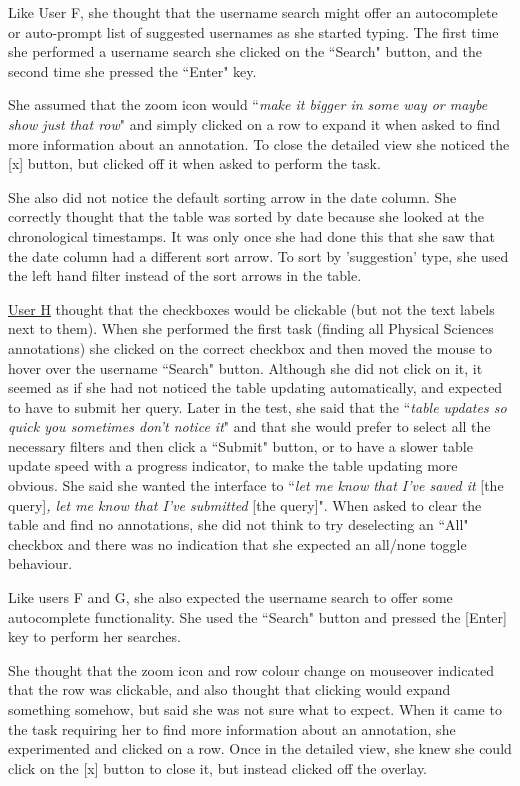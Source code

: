 Like User F, she thought that the username search might offer an autocomplete or auto-prompt list of suggested usernames as she started typing. The first time she performed a username search she clicked on the ``Search" button, and the second time she pressed the ``Enter" key. 

She assumed that the zoom icon would ``\textit{make it bigger in some way or maybe show just that row}" and simply clicked on a row to expand it when asked to find more information about an annotation. To close the detailed view she noticed the [x] button, but clicked off it when asked to perform the task. 

She also did not notice the default sorting arrow in the date column. She correctly thought that the table was sorted by date because she looked at the chronological timestamps. It was only once she had done this that she saw that the date column had a different sort arrow. To sort by 'suggestion' type, she used the left hand filter instead of the sort arrows in the table. 

\underline{User H} thought that the checkboxes would be clickable (but not the text labels next to them). When she performed the first task (finding all Physical Sciences annotations) she clicked on the correct checkbox and then moved the mouse to hover over the username ``Search" button. Although she did not click on it, it seemed as if she had not noticed the table updating automatically, and expected to have to submit her query. Later in the test, she said that the ``\textit{table updates so quick you sometimes don't notice it}" and that she would prefer to select all the necessary filters and then click a ``Submit" button, or to have a slower table update speed with a progress indicator, to make the table updating more obvious. She said she wanted the interface to ``\textit{let me know that I've saved it} [the query]\textit{, let me know that I've submitted} [the query]". When asked to clear the table and find no annotations, she did not think to try deselecting an ``All" checkbox and there was no indication that she expected an all/none toggle behaviour.

Like users F and G, she also expected the username search to offer some autocomplete functionality. She used the ``Search" button and pressed the [Enter] key to perform her searches. 

She thought that the zoom icon and row colour change on mouseover indicated that the row was clickable, and also thought that clicking would expand something somehow, but said she was not sure what to expect. When it came to the task requiring her to find more information about an annotation, she experimented and clicked on a row. Once in the detailed view, she knew she could click on the [x] button to close it, but instead clicked off the overlay. 

